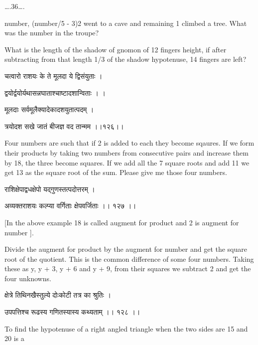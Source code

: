 \documentclass[]{article}
\date{}
\begin{document}
{\ldots{}.36\ldots{}.}

{number, (number/5 - 3)2 went to a cave and remaining 1 climbed a tree.
What was the number in the troupe?}

{What is the length of the shadow of gnomon of 12 fingers height, if
after subtracting from that length 1/3 of the shadow hypotenuse, 14
fingers are left?}

{चत्वारो राशयः के ते मूलदा ये द्विसंयुताः । }

{द्वयोर्द्वयोर्यथासन्नघाताश्चाष्टादशान्विताः । । }

{मूलदाः सर्वमूलैक्यादेकादशयुतात्पदम् । }

{त्रयोदश सखे जातं बीजज्ञ वद तान्मम ।।१२६।।}

{Four numbers are such that if 2 is added to each they become sqaures.
If we form their products by taking two numbers from consecutive pairs
and increase them by 18, the three become squares. If we add all the 7
square roots and add 11 we get 13 as the square root of the sum. Please
give me those four numbers.}

{राशिक्षेपाद्वधक्षेपो यद्गुणस्तत्पदोत्तरम् । }

{अव्यक्तराशयः कल्प्या वर्गिताः क्षेपवर्जिताः ।। १२७ ।। }

{{[}In the above example 18 is called augment for product and 2 is
augment for number {]}.}

{Divide the augment for product by the augment for number and get the
square root of the quotient. This is the common difference of some four
numbers. Taking these as y, y + 3, y + 6 and y + 9, from their squares
we subtract 2 and get the four unknowns.}

{क्षेत्रे तिथिनखैस्तुल्ये दोःकोटी तत्र का श्रुतिः । }

{उपपत्तिश्च रूढस्य गणितस्यास्य कथ्यताम् ।। १२८ ।। }

{To find the hypotenuse of a right angled triangle when the two sides
are 15 and 20 is a}
\end{document}
